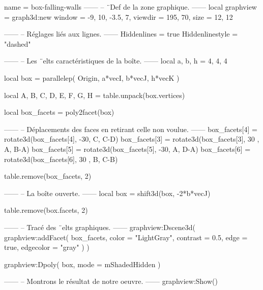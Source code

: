 \documentclass{standalone}
\begin{document}
\begin{luadraw}{name = box-falling-walls}
------
-- ¨Def de la zone graphique.
------
local graphview = graph3d:new{
  window  = {-9, 10, -3.5, 7},
  viewdir = {195, 70},
  size    = {12, 12}
}

------
-- Réglages liés aux lignes.
------
Hiddenlines     = true
Hiddenlinestyle = "dashed"

------
-- Les ¨elts caractéristiques de la boîte.
------
local a, b, h = 4, 4, 4

local box = parallelep(
  Origin,
  a*vecI, b*vecJ, h*vecK
)

local A, B, C, D, E, F, G, H = table.unpack(box.vertices)

local box_facets = poly2facet(box)

------
-- Déplacements des faces en retirant celle non voulue.
------
box_facets[4] = rotate3d(box_facets[4], -30, {C, C-D})
box_facets[3] = rotate3d(box_facets[3], 30 , {A, B-A})
box_facets[5] = rotate3d(box_facets[5], -30, {A, D-A})
box_facets[6] = rotate3d(box_facets[6], 30 , {B, C-B})

table.remove(box_facets, 2)

------
-- La boîte ouverte.
------
local box = shift3d(box, -2*b*vecJ)

table.remove(box.facets, 2)

------
-- Tracé des ¨elts graphiques.
------
graphview:Dscene3d(
  graphview:addFacet(
    box_facets,
    {
      color     = "LightGray",
      contrast  = 0.5,
      edge      = true,
      edgecolor = "gray"
    }
  )
)

graphview:Dpoly(
  box,
  {mode = mShadedHidden}
)

------
-- Montrons le résultat de notre oeuvre.
------
graphview:Show()
\end{luadraw}
\end{document}

